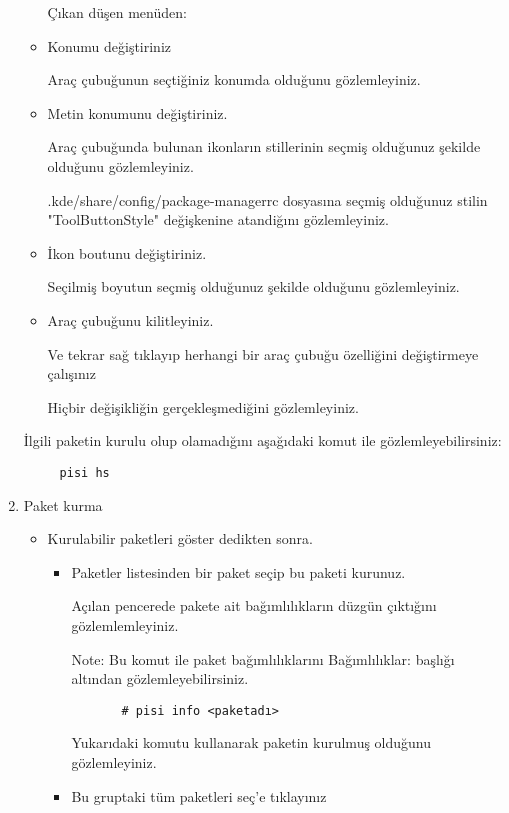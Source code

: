 \documentclass[a4paper,10pt]{article}
\begin{document}
\begin{enumerate}
\begin{itemize}
	Çıkan düşen menüden:
        \item Konumu değiştiriniz
      
	Araç çubuğunun seçtiğiniz konumda olduğunu gözlemleyiniz.
        \item Metin konumunu değiştiriniz.

	    Araç çubuğunda bulunan ikonların stillerinin seçmiş olduğunuz şekilde olduğunu gözlemleyiniz.
            
	    .kde/share/config/package-managerrc dosyasına seçmiş olduğunuz stilin "ToolButtonStyle" değişkenine atandiğını gözlemleyiniz.

        \item İkon boutunu değiştiriniz.
      
	Seçilmiş boyutun seçmiş olduğunuz şekilde olduğunu gözlemleyiniz.
        \item Araç çubuğunu kilitleyiniz.
    
            Ve tekrar sağ tıklayıp herhangi bir araç çubuğu özelliğini değiştirmeye çalışınız
	    
	    Hiçbir değişikliğin gerçekleşmediğini gözlemleyiniz.
    \end{itemize}

	İlgili paketin kurulu olup olamadığını aşağıdaki komut ile gözlemleyebilirsiniz:
	\begin{verbatim}
	 pisi hs
	\end{verbatim}

    \item Paket kurma

        \begin{itemize}
            \item Kurulabilir paketleri göster dedikten sonra. 
            \begin{itemize}
                \item Paketler listesinden bir paket seçip bu paketi kurunuz.
		
	Açılan pencerede pakete ait bağımlılıkların düzgün çıktığını gözlemlemleyiniz.
	
	 Note: Bu komut ile paket bağımlılıklarını Bağımlılıklar: başlığı altından gözlemleyebilirsiniz.
	  \begin{verbatim}
	   # pisi info <paketadı>
	  \end{verbatim}
	      

		
		Yukarıdaki komutu kullanarak paketin kurulmuş olduğunu gözlemleyiniz.
                \item Bu gruptaki tüm paketleri seç'e tıklayınız 


\end{itemize}
\end{itemize}
\end{enumerate}
\end{document}

